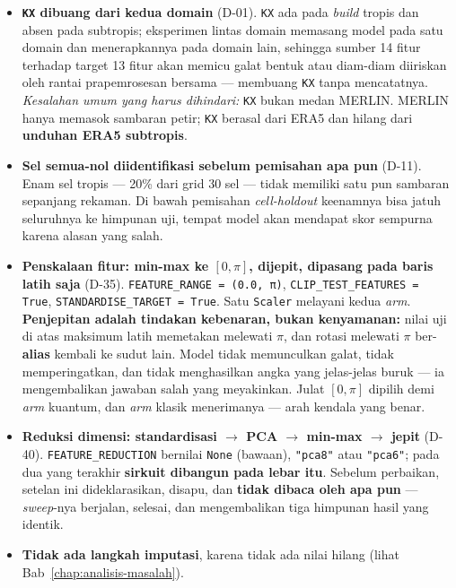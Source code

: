\begin{itemize}
          waktu adalah UTC (D-16), dan tanpa fitur jam lokal model harus
          mempelajari selisih UTC--lokal terpisah untuk setiap domain --- persis
          kekhasan domain yang tidak ingin diukur eksperimen lintas domain.
          Penyandian siklik dipakai karena jam 23 dan jam 0 bersebelahan.
          13/14/15 adalah salah satu sumbu \textit{sweep} OFAT.
    \item \textbf{\texttt{KX} dibuang dari kedua domain} (D-01). \texttt{KX} ada
          pada \textit{build} tropis dan absen pada subtropis; eksperimen lintas
          domain memasang model pada satu domain dan menerapkannya pada domain
          lain, sehingga sumber 14 fitur terhadap target 13 fitur akan memicu
          galat bentuk atau diam-diam diiriskan oleh rantai prapemrosesan
          bersama --- membuang \texttt{KX} tanpa mencatatnya.
          \textit{Kesalahan umum yang harus dihindari:} \texttt{KX} bukan medan
          MERLIN. MERLIN hanya memasok sambaran petir; \texttt{KX} berasal dari
          ERA5 dan hilang dari \textbf{unduhan ERA5 subtropis}.
    \item \textbf{Sel semua-nol diidentifikasi sebelum pemisahan apa pun}
          (D-11). Enam sel tropis --- 20\% dari grid 30 sel --- tidak memiliki
          satu pun sambaran sepanjang rekaman. Di bawah pemisahan
          \textit{cell-holdout} keenamnya bisa jatuh seluruhnya ke himpunan uji,
          tempat model akan mendapat skor sempurna karena alasan yang salah.
    \item \textbf{Penskalaan fitur: min-max ke $[0,\pi]$, dijepit, dipasang pada
          baris latih saja} (D-35). \texttt{FEATURE\_RANGE = (0.0, π)},
          \texttt{CLIP\_TEST\_FEATURES = True},
          \texttt{STANDARDISE\_TARGET = True}. Satu \texttt{Scaler} melayani
          kedua \textit{arm}.
          \textbf{Penjepitan adalah tindakan kebenaran, bukan kenyamanan:} nilai
          uji di atas maksimum latih memetakan melewati $\pi$, dan rotasi
          melewati $\pi$ ber-\textbf{alias} kembali ke sudut lain. Model tidak
          memunculkan galat, tidak memperingatkan, dan tidak menghasilkan angka
          yang jelas-jelas buruk --- ia mengembalikan jawaban salah yang
          meyakinkan. Julat $[0,\pi]$ dipilih demi \textit{arm} kuantum, dan
          \textit{arm} klasik menerimanya --- arah kendala yang benar.
    \item \textbf{Reduksi dimensi: standardisasi $\rightarrow$ PCA $\rightarrow$
          min-max $\rightarrow$ jepit} (D-40). \texttt{FEATURE\_REDUCTION}
          bernilai \texttt{None} (bawaan), \texttt{"pca8"} atau \texttt{"pca6"};
          pada dua yang terakhir \textbf{sirkuit dibangun pada lebar itu}.
          Sebelum perbaikan, setelan ini dideklarasikan, disapu, dan
          \textbf{tidak dibaca oleh apa pun} --- \textit{sweep}-nya berjalan,
          selesai, dan mengembalikan tiga himpunan hasil yang identik.
    \item \textbf{Tidak ada langkah imputasi}, karena tidak ada nilai hilang
          (lihat Bab~\ref{chap:analisis-masalah}).
\end{itemize}

